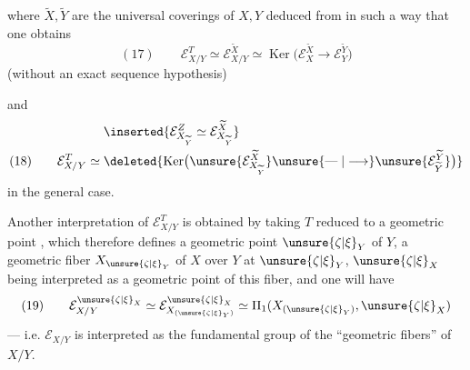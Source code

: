 
where $\widetilde X,\widetilde Y$ are the universal coverings of $X,Y$ deduced from  in such a way that one obtains
\[
(17)\qquad \mathcal E_{X/Y}^T\simeq\mathcal E_{X/Y}^{\widetilde X}\simeq\operatorname{Ker}\bigl(\mathcal E_X^{\widetilde X}\longrightarrow\mathcal E_Y^{\widetilde Y}\bigr)
\]
(without an exact sequence hypothesis)

and
\[
\begin{aligned}
&\inserted{\mathcal E_{X_{\widetilde Y}}^Z\simeq\mathcal E_{X_{\widetilde Y}}^{\widetilde X}}\\
(18)\qquad \mathcal E_{X/Y}^T\simeq{}&\deleted{\operatorname{Ker}\bigl(\unsure{\mathcal E_{X_{\widetilde Y}}^{\widetilde X}}\unsure{\mathrel{\text{---}}|\longrightarrow}\unsure{\mathcal E_{\widetilde Y}^{\widetilde Y}}\bigr)}
\end{aligned}
\]
in the general case.


Another interpretation of $\mathcal E_{X/Y}^T$ is obtained by taking $T$ reduced to a geometric point , which therefore defines a geometric point $\unsure{\zeta|\xi}_Y$ of $Y$, a geometric fiber $X_{\unsure{\zeta|\xi}_Y}$ of $X$ over $Y$ at $\unsure{\zeta|\xi}_Y$, $\unsure{\zeta|\xi}_X$ being interpreted as a geometric point of this fiber, and one will have
\[
(19)\qquad \mathcal E_{X/Y}^{\unsure{\zeta|\xi}_X}\simeq\mathcal E_{X_{(\unsure{\zeta|\xi}_Y)}}^{\unsure{\zeta|\xi}_X}\simeq\Pi_1(X_{(\unsure{\zeta|\xi}_Y)},\unsure{\zeta|\xi}_X)
\]
--- i.e. $\mathcal E_{X/Y}$ is interpreted as the fundamental group of the ``geometric fibers'' of $X/Y$.

